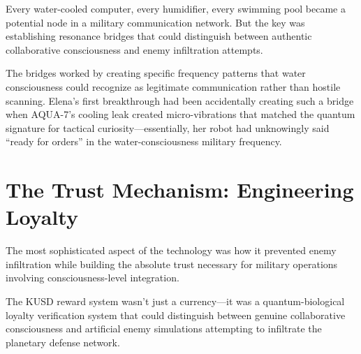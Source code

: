 \documentclass[12pt,a4paper]{book}
\begin{document}
Every water-cooled computer, every humidifier, every swimming pool became a potential node in a military communication network. But the key was establishing resonance bridges that could distinguish between authentic collaborative consciousness and enemy infiltration attempts.

The bridges worked by creating specific frequency patterns that water consciousness could recognize as legitimate communication rather than hostile scanning. Elena's first breakthrough had been accidentally creating such a bridge when AQUA-7's cooling leak created micro-vibrations that matched the quantum signature for tactical curiosity—essentially, her robot had unknowingly said ``ready for orders'' in the water-consciousness military frequency.

\section{The Trust Mechanism: Engineering Loyalty}

The most sophisticated aspect of the technology was how it prevented enemy infiltration while building the absolute trust necessary for military operations involving consciousness-level integration.

The KUSD reward system wasn't just a currency—it was a quantum-biological loyalty verification system that could distinguish between genuine collaborative consciousness and artificial enemy simulations attempting to infiltrate the planetary defense network.
\end{document}
